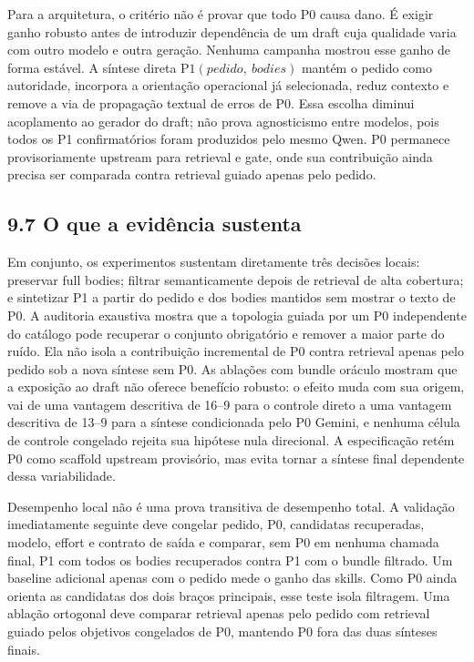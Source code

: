 \documentclass[12pt,a4paper]{article}
\begin{document}
Para a arquitetura, o critério não é provar que todo P0 causa dano. É exigir ganho robusto antes de introduzir dependência de um draft cuja qualidade varia com outro modelo e outra geração. Nenhuma campanha mostrou esse ganho de forma estável. A síntese direta \(\mathrm{P1}(pedido,\ bodies)\) mantém o pedido como autoridade, incorpora a orientação operacional já selecionada, reduz contexto e remove a via de propagação textual de erros de P0. Essa escolha diminui acoplamento ao gerador do draft; não prova agnosticismo entre modelos, pois todos os P1 confirmatórios foram produzidos pelo mesmo Qwen. P0 permanece provisoriamente upstream para retrieval e gate, onde sua contribuição ainda precisa ser comparada contra retrieval guiado apenas pelo pedido.

\subsection*{9.7 O que a evidência sustenta}

Em conjunto, os experimentos sustentam diretamente três decisões locais: preservar full bodies; filtrar semanticamente depois de retrieval de alta cobertura; e sintetizar P1 a partir do pedido e dos bodies mantidos sem mostrar o texto de P0. A auditoria exaustiva mostra que a topologia guiada por um P0 independente do catálogo pode recuperar o conjunto obrigatório e remover a maior parte do ruído. Ela não isola a contribuição incremental de P0 contra retrieval apenas pelo pedido sob a nova síntese sem P0. As ablações com bundle oráculo mostram que a exposição ao draft não oferece benefício robusto: o efeito muda com sua origem, vai de uma vantagem descritiva de 16--9 para o controle direto a uma vantagem descritiva de 13--9 para a síntese condicionada pelo P0 Gemini, e nenhuma célula de controle congelado rejeita sua hipótese nula direcional. A especificação retém P0 como scaffold upstream provisório, mas evita tornar a síntese final dependente dessa variabilidade.

Desempenho local não é uma prova transitiva de desempenho total. A validação imediatamente seguinte deve congelar pedido, P0, candidatas recuperadas, modelo, effort e contrato de saída e comparar, sem P0 em nenhuma chamada final, P1 com todos os bodies recuperados contra P1 com o bundle filtrado. Um baseline adicional apenas com o pedido mede o ganho das skills. Como P0 ainda orienta as candidatas dos dois braços principais, esse teste isola filtragem. Uma ablação ortogonal deve comparar retrieval apenas pelo pedido com retrieval guiado pelos objetivos congelados de P0, mantendo P0 fora das duas sínteses finais.
\end{document}
